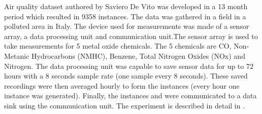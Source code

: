 Air quality dataset \cite{airQualityData} authored by Saviero De Vito was developed in a 13 month period which resulted in
9358 instances. The data was gathered in a field in a polluted area in Italy. The device used for measurements was made of a sensor
array, a data processing unit and communication unit.The sensor array is used to take measurements for 5 metal oxide chemicals.
The 5 chemicals are CO, Non-Metanic Hydrocarbons (NMHC), Benzene, Total Nitrogen Oxides (NOx) and Nitrogen. The data processing
unit was capable to save sensor data for up to 72 hours with a 8 seconds sample rate (one sample every 8 seconds). These saved
recordings were then averaged hourly to form the instances (every hour one instance was generated). Finally, the instances and
were communicated to a data sink using the communication unit. The experiment is described in detail in \cite{DEVITO2008750}.


